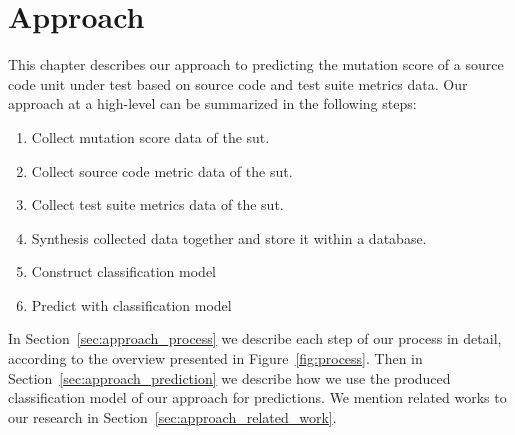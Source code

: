 \chapter{Approach}
\label{chap:approach}
This chapter describes our approach to predicting the mutation score of a source code unit under test based on source code and test suite metrics data. Our approach at a high-level can be summarized in the following steps:

\begin{enumerate}
	\item Collect mutation score data of the \gls{sut}.
	\item Collect source code metric data of the \gls{sut}.
	\item Collect test suite metrics data of the \gls{sut}.
	\item Synthesis collected data together and store it within a database.
	\item Construct classification model
	\item Predict with classification model
\end{enumerate}

In Section~\ref{sec:approach_process} we describe each step of our process in detail, according to the overview presented in Figure~\ref{fig:process}. Then in Section~\ref{sec:approach_prediction} we describe how we use the produced classification model of our approach for predictions. We mention related works to our research in Section~\ref{sec:approach_related_work}.

